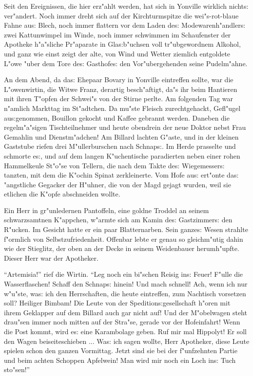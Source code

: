 \documentclass[oneside,12pt]{book}
\newcommand{\s}{s:}%
\begin{document}
Seit den Ereignissen, die hier erz"ahlt werden, hat sich in
Yonville wirklich nicht{\s} ver"andert. Noch immer dreht sich auf
der Kirchturmspitze die wei"s-rot-blaue Fahne au{\s} Blech, noch
immer flattern vor dem Laden de{\s} Modewarenh"andler{\s} zwei
Kattunwimpel im Winde, noch immer schwimmen im Schaufenster der
Apotheke h"a"sliche Pr"aparate in Gla{\s}b"uchsen voll
tr"ubgewordnem Alkohol, und ganz wie einst zeigt der alte, von
Wind und Wetter ziemlich entgoldete L"owe "uber dem Tore de{\s}
Gasthofe{\s} den Vor"ubergehenden seine Pudelm"ahne.

An dem Abend, da da{\s} Ehepaar Bovary in Yonville eintreffen
sollte, war die L"owenwirtin, die Witwe Franz, derartig
besch"aftigt, da"s ihr beim Hantieren mit ihren T"opfen der
Schwei"s von der Stirne perlte. Am folgenden Tag war n"amlich
Markttag im St"adtchen. Da mu"ste Fleisch zurechtgehackt,
Gefl"ugel au{\s}genommen, Bouillon gekocht und Kaffee gebrannt
werden. Daneben die regelm"a"sigen Tischteilnehmer und heute
obendrein der neue Doktor nebst Frau Gemahlin und Dienstm"adchen!
Am Billard lachten G"aste, und in der kleinen Gaststube riefen
drei M"ullerburschen nach Schnap{\s}. Im Herde prasselte und
schmorte e{\s}, und auf dem langen K"uchentische paradierten neben
einer rohen Hammelkeule St"o"se von Tellern, die nach dem Takte
de{\s} Wiegemesser{\s} tanzten, mit dem die K"ochin Spinat
zerkleinerte. Vom Hofe au{\s} ert"onte da{\s} "angstliche Gegacker
der H"uhner, die von der Magd gejagt wurden, weil sie etlichen die
K"opfe abschneiden wollte.

Ein Herr in gr"unledernen Pantoffeln, eine goldne Troddel an
seinem schwarz\-samt\-nen K"appchen, w"armte sich am Kamin de{\s}
Gast\/zimmer{\s} den R"ucken. Im Gesicht hatte er ein paar
Blatternarben. Sein ganze{\s} Wesen strahlte f"ormlich von
Selbst\/zufriedenheit. Offenbar lebte er genau so gleichm"utig dahin
wie der Stieglitz, der oben an der Decke in seinem Weidenbauer
herumh"upfte. Dieser Herr war der Apotheker.

"`Artemisia!"' rief die Wirtin. "`Leg noch ein bi"schen Reisig
in{\s} Feuer! F"ulle die Wasserflaschen! Schaff den Schnap{\s}
hinein! Und mach schnell! Ach, wenn ich nur w"u"ste, wa{\s} ich
den Herrschaften, die heute eintreffen, zum Nachtisch vorsetzen
soll? Heiliger Bimbam! Die Leute von der Spedition{\s}gesellschaft
h"oren mit ihrem Geklapper auf dem Billard auch gar nicht auf! Und
der M"obelwagen steht drau"sen immer noch mitten auf der Stra"se,
gerade vor der Hofeinfahrt! Wenn die Post kommt, wird e{\s} eine
Karambolage geben. Ruf mir mal Hippolyt! Er soll den Wagen
beiseiteschieben ... Wa{\s} ich sagen wollte, Herr Apotheker,
diese Leute spielen schon den ganzen Vormittag. Jetzt sind sie bei
der f"unfzehnten Partie und beim achten Schoppen Apfelwein! Man
wird mir noch ein Loch in{\s} Tuch sto"sen!"'
\end{document}
